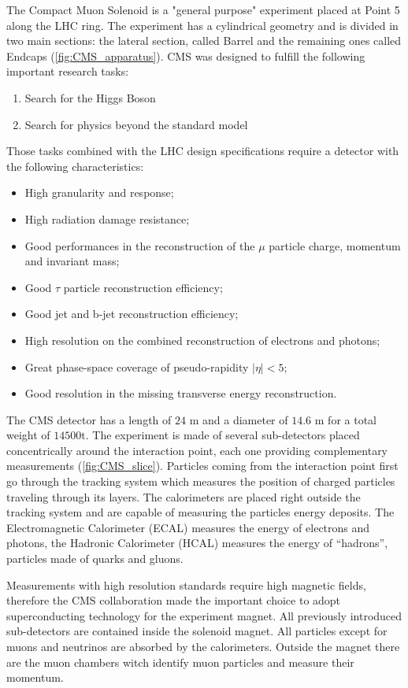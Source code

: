 The Compact Muon Solenoid is a "general purpose" experiment placed at Point 5 along the LHC ring. The experiment has a cylindrical geometry and is divided in two main sections: the lateral section, called Barrel and the remaining ones called Endcaps (\autoref{fig:CMS_apparatus}).   
CMS was designed to fulfill the following important research tasks:
\begin{enumerate}
	\item Search for the Higgs Boson
	\item Search for physics beyond the standard model
\end{enumerate}
Those tasks combined with the LHC design specifications require a detector with the following characteristics:
\begin{itemize}
	\item High granularity and response;
	\item High radiation damage resistance;
	\item Good performances in the reconstruction of the $\mu$ particle charge, momentum and invariant mass;
	\item Good $\tau$ particle reconstruction efficiency;
	\item Good jet and b-jet reconstruction efficiency;
	\item High resolution on the combined reconstruction of electrons and photons;
	\item Great phase-space coverage of pseudo-rapidity $|\eta| < 5$;
	\item Good resolution in the missing transverse energy reconstruction.
\end{itemize} 

The CMS detector has a length of $24$ m and a diameter of $14.6$ m for a total weight of $14500 \text{t}$. The experiment is made of several sub-detectors placed concentrically around the interaction point, each one providing complementary measurements (\autoref{fig:CMS_slice}). Particles coming from the interaction point first go through the tracking system which measures the position of charged particles traveling through its layers. The calorimeters are placed right outside the tracking system and are capable of measuring the particles energy deposits. The Electromagnetic Calorimeter (ECAL) measures the energy of electrons and photons, the Hadronic Calorimeter (HCAL) measures the energy of “hadrons”, particles made of quarks and gluons.
 
Measurements with high resolution standards require high magnetic fields, therefore the CMS collaboration made the important choice to adopt superconducting technology for the experiment magnet. All previously introduced sub-detectors are contained inside the solenoid magnet. All particles except for muons and neutrinos are absorbed by the calorimeters. Outside the magnet there are the muon chambers witch identify muon particles and measure their momentum.

